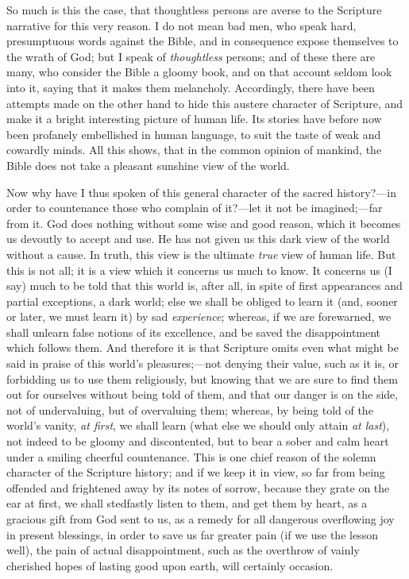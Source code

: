So much is this the case, that thoughtless persons are
averse to the Scripture narrative for this very reason. I
do not mean bad men, who speak hard, presumptuous words
against the Bible, and in consequence expose themselves
to the wrath of God; but I speak of \emph{thoughtless}
persons; and of these there are many, who consider the
Bible a gloomy book, and on that account seldom look into
it, saying that it makes them melancholy. Accordingly,
there have been attempts made on the other hand to hide
this austere character of Scripture, and make it a bright
interesting picture of human life. Its stories have
before now been profanely embellished in human language,
to suit the taste of weak and cowardly minds. All this
shows, that in the common opinion of mankind, the Bible
does not take a pleasant sunshine view of the world.

Now why have I thus spoken of this general character
of the sacred history?—in order to countenance those
who complain of it?—let it not be imagined;—far
from it. God does nothing without some wise and good
reason, which it becomes us devoutly to accept and use.
He has not given us this dark view of the world without a
cause. In truth, this view is the ultimate \emph{true}
view of human life. But this is not all; it is a view
which it concerns us much to know. It concerns us (I say)
much to be told that this world is, after all, in spite
of first appearances and partial exceptions, a dark
world; else we shall be obliged to learn it (and, sooner
or later, we must learn it) by sad \emph{experience};
whereas, if we are forewarned, we shall unlearn false
notions of its excellence, and be saved the
disappointment which follows them. And therefore it is
that Scripture omits even what might be said in praise of
this world's pleasures;—not denying their value,
such as it is, or forbidding us to use them religiously,
but knowing that we are sure to find them out for
ourselves without being told of them, and that our danger
is on the side, not of undervaluing, but of overvaluing
them; whereas, by being told of the world's vanity, \emph{at
first}, we shall learn (what else we should only
attain \emph{at last}), not indeed to be gloomy and
discontented, but to bear a sober and calm heart under a
smiling cheerful countenance. This is one chief reason of
the solemn character of the Scripture history; and if we
keep it in view, so far from being offended and
frightened away by its notes of sorrow, because they
grate on the ear at first, we shall stedfastly listen to
them, and get them by heart, as a gracious gift from God
sent to us, as a remedy for all dangerous overflowing joy
in present blessings, in order to save us far greater
pain (if we use the lesson well), the pain of actual
disappointment, such as the overthrow of vainly cherished
hopes of lasting good upon earth, will certainly
occasion.

